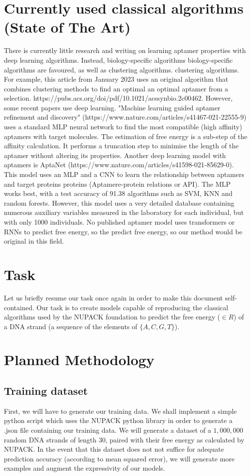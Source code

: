 \documentclass{article}
\begin{document}
\section{Currently used classical algorithms (State of The Art)}
There is currently little research and writing on learning 
aptamer properties with deep learning algorithms. Instead, biology-specific algorithms 
biology-specific algorithms are favoured, as well as clustering algorithms. 
clustering algorithms. For example, this article from January 2023 uses 
an original algorithm that combines clustering methods to find an optimal 
an optimal aptamer from a selection. 
https://pubs.acs.org/doi/pdf/10.1021/acssynbio.2c00462.
However, some recent papers use deep learning. 
"Machine learning guided aptamer refinement 
and discovery" (https://www.nature.com/articles/s41467-021-22555-9) 
uses a standard MLP neural network to find the most compatible (high affinity) aptamers with target molecules. The estimation of free energy is a sub-step of the affinity calculation. It performs a 
truncation step to minimise the length of the aptamer without altering its properties. 
Another deep learning model with aptamers is AptaNet 
(https://www.nature.com/articles/s41598-021-85629-0). This model uses an 
MLP and a CNN to learn the relationship between aptamers and target proteins 
proteins (Aptamere-protein relations or API). The MLP works best, with a 
test accuracy of 91.38%
algorithms such as SVM, KNN and random forests. However, this model 
uses a very detailed database containing numerous auxiliary variables 
measured in the laboratory for each individual, but with only 1000 individuals. 
No published aptamer model uses transformers or RNNs to predict free energy, so the 
predict free energy, so our method would be original in this field.

\section{Task}
Let us briefly resume our task once again in order to make this document
self-contained. Our task is to create models capable of reproducing 
the classical algorithms used by the NUPACK foundation to predict the 
free energy ($\in R$) of a DNA strand (a sequence of the elements of $\{A,C,G,T\}$).
\section{Planned Methodology}
\subsection{Training dataset}
First, we will have to generate our training data. We shall implement a 
simple python script which uses the NUPACK python library in order
to generate a .json file containing our training data. We  
will generate a dataset of a $1,000,000$ random DNA strands of length $30$, paired with their free energy as calculated by NUPACK. In the event that this dataset does not not
suffice for adequate prediction accuracy (according to mean squared error), we will
generate more examples and augment the expressivity of our models.
\end{document}
